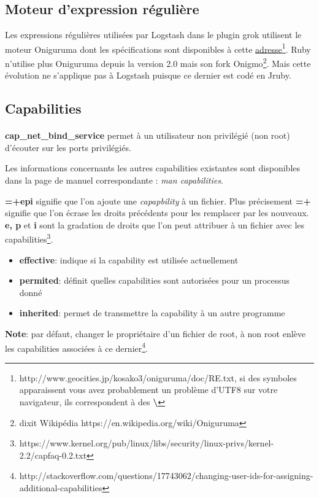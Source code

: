 \subsection{Moteur d'expression régulière}
\label{subsec:logstashregexengine}
Les expressions régulières utilisées par Logstash dans le plugin grok utilisent le 
moteur Oniguruma dont les spécifications sont disponibles à cette 
\href{http://www.geocities.jp/kosako3/oniguruma/doc/RE.txt}{adresse}\footnote{http://www.geocities.jp/kosako3/oniguruma/doc/RE.txt, 
si des symboles \textbf{ \textyen} apparaissent vous avez probablement un problème d'UTF8 sur 
votre navigateur, ils correspondent à des \textbf{ \textbackslash}}.
Ruby n'utilise plus Oniguruma depuis la version 2.0 mais son fork Onigmo\footnote{
dixit Wikipédia https://en.wikipedia.org/wiki/Oniguruma}. Mais cette évolution ne
s'applique pas à Logstash puisque ce dernier est codé en Jruby.

\subsection{Capabilities}
\paragraph{}
\label{subsec:logstashcapabilities}
\textbf{cap\_net\_bind\_service} permet à un utilisateur non privilégié (non root) 
d'écouter sur les ports privilégiés.

Les informations concernants les autres capabilities existantes sont disponibles dans
la page de manuel correspondante : \emph{man capabilities}.

\textbf{=+epi} signifie que l'on ajoute une \emph{capapbility} à un fichier. Plus 
précisement \textbf{=+} signifie que l'on écrase les droits précédents pour les remplacer
par les nouveaux. \textbf{e, p} et \textbf{i} sont la gradation de droits que l'on peut 
attribuer à un fichier avec les capabilities\footnote{\scriptsize{https://www.kernel.org/pub/linux/libs/security/linux-privs/kernel-2.2/capfaq-0.2.txt}}.
\begin{itemize}
    \item \textbf{effective}: indique si la capability est utilisée actuellement
    \item \textbf{permited}: définit quelles capabilities sont autorisées pour un 
    processus donné
    \item \textbf{inherited}: permet de transmettre la capability à un autre programme
\end{itemize}
\textbf{Note}: par défaut, changer le propriétaire d'un fichier de root, à non root enlève
les capabilities associées à ce dernier\footnote{\scriptsize{http://stackoverflow.com/questions/17743062/changing-user-ids-for-assigning-additional-capabilities}}.

